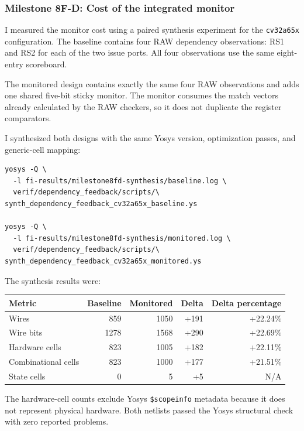 \subsubsection*{Milestone 8F-D: Cost of the integrated monitor}

I measured the monitor cost using a paired synthesis experiment for the
\texttt{cv32a65x} configuration. The baseline contains four RAW dependency
observations: RS1 and RS2 for each of the two issue ports. All four observations
use the same eight-entry scoreboard.

The monitored design contains exactly the same four RAW observations and adds
one shared five-bit sticky monitor. The monitor consumes the match vectors
already calculated by the RAW checkers, so it does not duplicate the register
comparators.

I synthesized both designs with the same Yosys version, optimization passes,
and generic-cell mapping:

\begin{verbatim}
yosys -Q \
  -l fi-results/milestone8fd-synthesis/baseline.log \
  verif/dependency_feedback/scripts/\
synth_dependency_feedback_cv32a65x_baseline.ys

yosys -Q \
  -l fi-results/milestone8fd-synthesis/monitored.log \
  verif/dependency_feedback/scripts/\
synth_dependency_feedback_cv32a65x_monitored.ys
\end{verbatim}

The synthesis results were:

\begin{center}
\begin{tabular}{lrrrr}
\hline
Metric & Baseline & Monitored & Delta & Delta percentage \\
\hline
Wires               & 859  & 1050 & +191 & +22.24\% \\
Wire bits           & 1278 & 1568 & +290 & +22.69\% \\
Hardware cells      & 823  & 1005 & +182 & +22.11\% \\
Combinational cells & 823  & 1000 & +177 & +21.51\% \\
State cells         & 0    & 5    & +5   & N/A \\
\hline
\end{tabular}
\end{center}

The hardware-cell counts exclude Yosys \texttt{\$scopeinfo} metadata because
it does not represent physical hardware. Both netlists passed the Yosys
structural check with zero reported problems.

